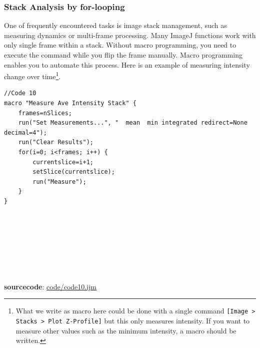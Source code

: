 \documentclass[11pt,a4paper,oneside]{report}
\newcommand{\ilcom}[1]{\texttt{\small#1}}
\begin{document}
\subsubsection{Stack Analysis by for-looping}
\label{sec:forloopStack}
One of frequently encountered tasks is image stack management, 
such as measuring dynamics or multi-frame processing. 
Many ImageJ functions work with only single frame within a stack. 
Without macro programming, you need to execute the command while you flip the frame manually. 
Macro programming enables you to automate this process. 
Here is an example of measuring intensity change over time\footnote{What we write as macro here could be done with a single command \ilcom{[Image > Stacks > Plot Z-Profile]} but this only measures intensity. If you want to measure other values such as the minimum intensity, a macro should be written. }. 

\label{code:10}

\begin{lstlisting}[morekeywords={*, run, setSlice, nSlices}]
//Code 10
macro "Measure Ave Intensity Stack" {
	frames=nSlices;
	run("Set Measurements...", "  mean  min integrated redirect=None decimal=4");
	run("Clear Results");
	for(i=0; i<frames; i++) {
		currentslice=i+1;
		setSlice(currentslice);
		run("Measure");
	}
}








\end{lstlisting}
\textbf{sourcecode}: \href{http://www.example.com/contents}{code/code10.ijm}
\end{document}
